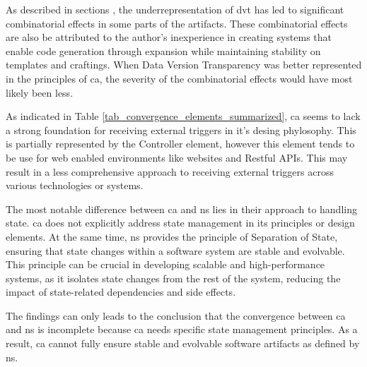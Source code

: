 As described in sections , the underrepresentation of \gls{dvt} has
led to significant combinatorial effects in some parts of the artifacts. These
combinatorial effects are also be attributed to the author's inexperience in creating
systems that enable code generation through expansion while maintaining stability on
templates and craftings. When Data Version Transparency was better represented in the
principles of \gls{ca}, the severity of the combinatorial effects would have most likely
been less.

As indicated in Table \ref{tab_convergence_elements_summarized}, \gls{ca} seems to lack a
strong foundation for receiving external triggers in it's desing phylosophy. This is
partially represented by the Controller element, however this element tends to be use for
web enabled environments like websites and Restful APIs. This may result in a less
comprehensive approach to receiving external triggers across various technologies or
systems.

The most notable difference between \gls{ca} and \gls{ns} lies in their approach to
handling state. \gls{ca} does not explicitly address state management in its principles or
design elements. At the same time, \gls{ns} provides the principle of Separation of State,
ensuring that state changes within a software system are stable and evolvable. This
principle can be crucial in developing scalable and high-performance systems, as it
isolates state changes from the rest of the system, reducing the impact of state-related
dependencies and side effects. 

The findings can only leads to the conclusion that the convergence between \gls{ca} and
\gls{ns} is incomplete because \gls{ca} needs specific state management principles. As a
result, \gls{ca} cannot fully ensure stable and evolvable software artifacts as defined by
\gls{ns}.






